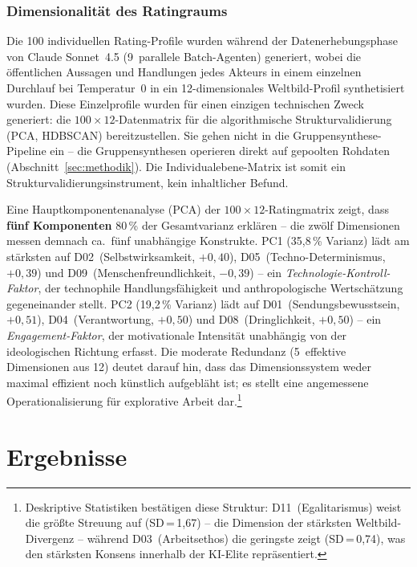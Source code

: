 \documentclass[12pt,a4paper]{article}
\begin{document}
\subsubsection{Dimensionalität des Ratingraums}

Die 100 individuellen Rating-Profile wurden während der Datenerhebungsphase von Claude Sonnet~4.5 (9~parallele Batch-Agenten) generiert, wobei die öffentlichen Aussagen und Handlungen jedes Akteurs in einem einzelnen Durchlauf bei Temperatur~0 in ein 12-dimensionales Weltbild-Profil synthetisiert wurden. Diese Einzelprofile wurden für einen einzigen technischen Zweck generiert: die $100 \times 12$-Datenmatrix für die algorithmische Strukturvalidierung (PCA, HDBSCAN) bereitzustellen. Sie gehen nicht in die Gruppensynthese-Pipeline ein -- die Gruppensynthesen operieren direkt auf gepoolten Rohdaten (Abschnitt~\ref{sec:methodik}). Die Individualebene-Matrix ist somit ein Strukturvalidierungsinstrument, kein inhaltlicher Befund.

Eine Hauptkomponentenanalyse (PCA) der $100 \times 12$-Ratingmatrix zeigt, dass \textbf{fünf Komponenten} 80\,\% der Gesamtvarianz erklären -- die zwölf Dimensionen messen demnach ca.\ fünf unabhängige Konstrukte. PC1 (35,8\,\% Varianz) lädt am stärksten auf D02~(Selbstwirksamkeit, $+0{,}40$), D05~(Techno-Determinismus, $+0{,}39$) und D09~(Menschenfreundlichkeit, $-0{,}39$) -- ein \emph{Technologie-Kontroll-Faktor}, der technophile Handlungsfähigkeit und anthropologische Wertschätzung gegeneinander stellt. PC2 (19,2\,\% Varianz) lädt auf D01~(Sendungsbewusstsein, $+0{,}51$), D04~(Verantwortung, $+0{,}50$) und D08~(Dringlichkeit, $+0{,}50$) -- ein \emph{Engagement-Faktor}, der motivationale Intensität unabhängig von der ideologischen Richtung erfasst. Die moderate Redundanz (5~effektive Dimensionen aus 12) deutet darauf hin, dass das Dimensionssystem weder maximal effizient noch künstlich aufgebläht ist; es stellt eine angemessene Operationalisierung für explorative Arbeit dar.\footnote{Deskriptive Statistiken bestätigen diese Struktur: D11~(Egalitarismus) weist die größte Streuung auf (SD\,=\,1,67) -- die Dimension der stärksten Weltbild-Divergenz -- während D03~(Arbeitsethos) die geringste zeigt (SD\,=\,0,74), was den stärksten Konsens innerhalb der KI-Elite repräsentiert.}


\section{Ergebnisse}
\label{sec:ergebnisse}
\end{document}
